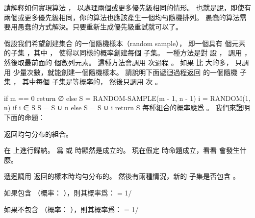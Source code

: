 \startEXERCISE
請解釋如何實現算法 ，
以處理兩個或更多優先級相同的情形。
也就是說，即使有兩個或更多優先級相同，你的算法也應該產生一個均勻隨機排列。
\stopEXERCISE
\startANSWER
愚蠢的算法需要用愚蠢的方式解決。只要重新生成優先級重試就可以了。
\stopANSWER

\startEXERCISE
假設我們希望創建集合  的一個{\EMP 隨機樣本（random sample）}，
即一個具有  個元素的子集 ，其中 ，
使得以同樣的概率創建每個  子集。
一種方法是對  設 ，
調用 ，
然後取最前面的  個數列元素。
這種方法會調用  次過程 。
如果  比  大的多，
只調用  少量次數，就能創建一個隨機樣本。
請說明下面遞迴過程返回  的一個隨機  子集 ，
其中每個  子集是等概率的，
然後只調用  次 。

\startCLRS
if m == 0
	return ∅
else S = RANDOM-SAMPLE(m - 1, n - 1)
	i = RANDOM(1, n)
	if i ∈ S
		S = S ∪ {n}
	else S = S ∪ {i}
	return S
\stopCLRS
\stopEXERCISE
\startANSWER
每種組合的概率應爲 。
我們來證明下面的命題：

 返回均勻分布的組合。

在  上進行歸納。  爲  或  時顯然是成立的。
現在假定  時命題成立，看看  會發生什麼。

遞迴調用  返回的樣本時均勻分布的。
然後有兩種情況，新的  子集是否包含 。

如果包含  （概率： ），則其概率爲：
\startformula
{} = 1/
\stopformula

如果不包含  （概率： ），則其概率爲：
\startformula
{} = 1/
\stopformula
\stopANSWER

\stopsection
